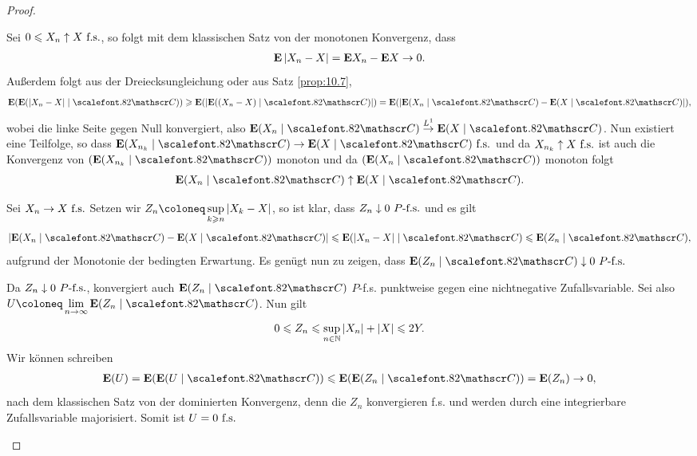 \begin{proof}
\begin{proofenum}
\item Sei $0\leqslant X_n \uparrow X\ \text{f.s.}$, so folgt mit dem klassischen Satz von der
monotonen Konvergenz, dass
\begin{align*}
\textbf{E} \left|X_n-X\right| = \textbf{E} X_n - \textbf{E} X \to 0.
\end{align*}
Außerdem folgt aus der Dreiecksungleichung oder aus Satz \ref{prop:10.7},
\begin{align*}
\E(\E(\abs{X_n-X}\mid \CC))
\ge \E(\abs{\E((X_n-X)\mid \CC)})
=
\E(\abs{\E(X_n\mid \CC)-\E(X\mid \CC)}),
\end{align*}
wobei die linke Seite gegen Null konvergiert, also
$\E(X_n\mid\CC)\overset{L^1}{\to}\E(X\mid\CC)$. Nun existiert eine Teilfolge,
so dass $\E(X_{n_k}\mid \CC)\to \E(X\mid \CC)\fs$ und da $X_{n_k}\uparrow X\ \text{f.s.}$
ist auch die Konvergenz von $(\E(X_{n_k}\mid\CC))$ monoton und da
$(\E(X_n\mid\CC))$ monoton folgt
\begin{align*}
\E(X_n\mid \CC)\uparrow \E(X\mid \CC).
\end{align*}
\item Sei $X_n\to X\ \text{f.s.}$ Setzen wir $Z_n\defl\sup\limits_{k\ge n} \abs{X_k-X}$, so
ist klar, dass $Z_n\downarrow 0\ P\text{-f.s.}$ und es gilt
\begin{align*}
\abs{\E(X_n\mid\CC)-\E(X\mid\CC)} \le 
\E(\abs{X_n-X}\mid\CC) \le \E(Z_n\mid\CC),
\end{align*}
aufgrund der Monotonie der bedingten Erwartung. Es genügt nun zu zeigen, dass
$\E(Z_n\mid\CC)\downarrow 0\Pfs$

Da $Z_n \downarrow 0\ P\text{-f.s.}$, konvergiert auch $\E(Z_n\mid\CC)$ $P$-f.s. punktweise
gegen eine nichtnegative Zufallsvariable. Sei also $U\defl \lim\limits_{n\to\infty}
\E(Z_n\mid\CC)$. Nun gilt
\begin{align*}
0 \leqslant Z_n \leqslant \sup_{n\in\mathbb{N}} \left|X_n\right| + \left|X\right| \leqslant 2 Y.
\end{align*}
Wir können schreiben
\begin{align*}
\E(U) = \E(\E(U\mid\CC)) \le \E(\E(Z_n\mid\CC)) = \E(Z_n)\to 0,
\end{align*}
nach dem klassischen Satz von der dominierten Konvergenz, denn die $Z_n$
konvergieren f.s. und werden durch eine integrierbare Zufallsvariable
majorisiert. Somit ist $U=0\ \text{f.s.}$\qedhere
\end{proofenum}
\end{proof}

